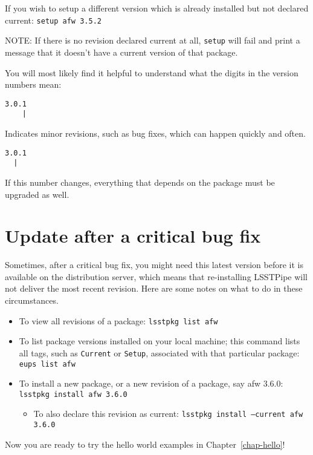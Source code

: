If you wish to setup a different version which is already installed but not declared current:
\texttt{setup afw 3.5.2} 

NOTE: If there is no revision declared current at all, \texttt{setup} will fail and print a message that it doesn't have a current version of that package.

You will most likely find it helpful to understand what the digits in the version numbers mean:
\begin{verbatim}
3.0.1
    |
\end{verbatim}
Indicates minor revisions, such as bug fixes, which can happen quickly and often.
\begin{verbatim}
3.0.1
  |
\end{verbatim}
If this number changes, everything that depends on the package must be upgraded as well.



\section{Update after a critical bug fix}
Sometimes, after a critical bug fix, you might need this latest version before it is available on the distribution server, which means that re-installing LSSTPipe will not deliver the most recent revision.  Here are some notes on what to do in these circumstances.

\begin{itemize}
\item To view all revisions of a package: \texttt{lsstpkg list afw}

\item To list package versions installed on your local machine; this command lists all tags, such as \texttt{Current} or \texttt{Setup}, associated with that particular package:  \texttt{eups list afw}

\item To install a new package, or a new revision of a package, say afw 3.6.0: \texttt{lsstpkg install afw 3.6.0}
\begin{itemize}
\item To also declare this revision as current:  \texttt{lsstpkg install --current afw 3.6.0}
\end{itemize}
\end{itemize}
 
\vskip0.5in

Now you are ready to try the hello world examples in
Chapter~\ref{chap-hello}! 
